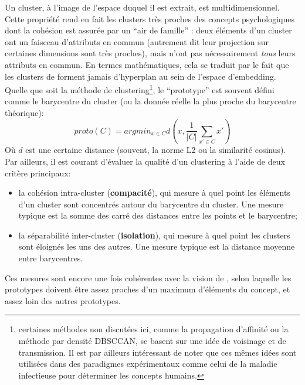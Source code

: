 \documentclass[french]{article}
\begin{document}
				
				Un cluster, à l'image de l'espace duquel il est extrait, est multidimensionnel. Cette propriété rend en fait les clusters très proches des concepts psychologiques dont la cohésion est assurée par un ``air de famille'' : deux éléments d'un cluster ont un faisceau d'attributs en commun (autrement dit leur projection sur certaines dimensions sont très proches), mais n'ont pas nécessairement \textit{tous} leurs attributs en commun. En termes mathématiques, cela se traduit par le fait que les clusters de forment jamais d'hyperplan au sein de l'espace d'embedding. Quelle que soit la méthode de clustering\footnote{certaines méthodes non discutées ici, comme la propagation d'affinité ou la méthode par densité DBSCCAN, se basent sur une idée de voisinage et de transmission. Il est par ailleurs intéressant de noter que ces mêmes idées sont utilisées dans des paradigmes expérimentaux comme celui de la maladie infectieuse pour déterminer les concepts humains.}, le ``prototype'' est souvent défini comme le barycentre du cluster (ou la donnée réelle la plus proche du barycentre théorique):
				\begin{equation*}
					proto(C) = argmin_{x \in C} d\left(x, \frac{1}{|C|}\sum_{x' \in C}x' \right)
				\end{equation*}
				Où $d$ est une certaine distance (souvent, la norme L2 ou la similarité cosinus).\\
				
				Par ailleurs, il est courant d'évaluer la qualité d'un clustering à l'aide de deux critère principaux:
				\begin{itemize}
					\item la cohésion intra-cluster (\textbf{compacité}), qui mesure à quel point les éléments d'un cluster sont concentrés autour du barycentre du cluster. Une mesure typique est la somme des carré des distances entre les points et le barycentre;
					\item la séparabilité inter-cluster (\textbf{isolation}), qui mesure à quel point les clusters sont éloignés les uns des autres. Une mesure typique est la distance moyenne entre barycentres.
				\end{itemize}
				Ces mesures sont encore une fois cohérentes avec la vision de \cite{rosch1975}, selon laquelle les prototypes doivent être assez proches d'un maximum d'éléments du concept, et assez loin des autres prototypes.\\
				
\end{document}

